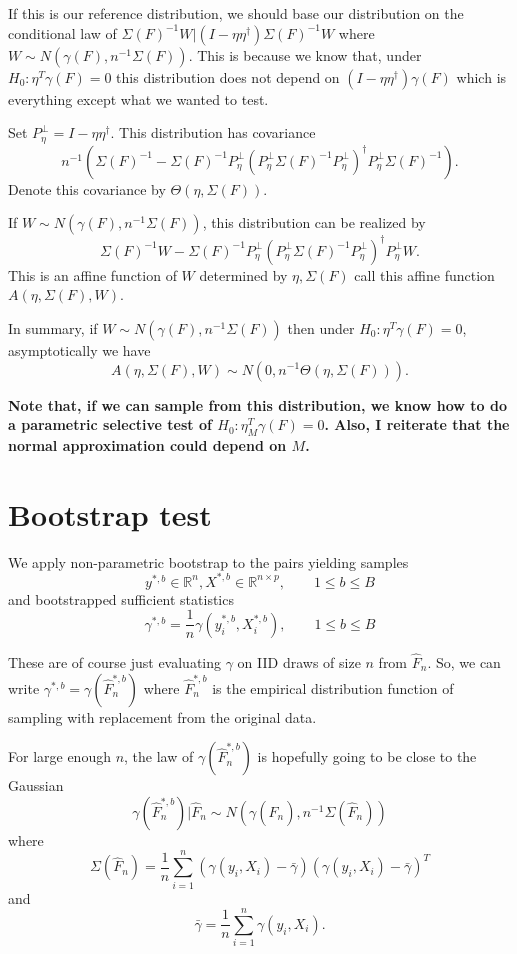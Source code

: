 \documentclass{article}
\newcommand{\real}{\mathbb{R}}
\begin{document}
If this is our reference distribution, we should base our distribution on the 
conditional law of $\Sigma(F)^{-1}W | (I - \eta\eta^{\dagger})\Sigma(F)^{-1}W$ where
$W \sim N(\gamma(F), n^{-1} \Sigma(F))$. This is because
we know that, under $H_0:\eta^T\gamma(F)=0$
this distribution does not depend on $(I-\eta\eta^{\dagger})\gamma(F)$ which
is everything except what we wanted to test. 

Set $P_{\eta}^{\perp}=I - \eta\eta^{\dagger}$.
This 
distribution has covariance
$$
n^{-1} \left(\Sigma(F)^{-1} - \Sigma(F)^{-1} P_{\eta}^{\perp} \left(P_{\eta}^{\perp} \Sigma(F)^{-1} P_{\eta}^{\perp} \right)^{\dagger}  P_{\eta}^{\perp} \Sigma(F)^{-1}  \right).
$$
Denote this covariance by $\Theta(\eta, \Sigma(F))$. 

If $W \sim N(\gamma(F), n^{-1}\Sigma(F))$,
this distribution can be realized by 
$$
\Sigma(F)^{-1} W - \Sigma(F)^{-1} P_{\eta}^{\perp} \left(P_{\eta}^{\perp} 
\Sigma(F)^{-1} P_{\eta}^{\perp} \right)^{\dagger}  P_{\eta}^{\perp} W.
$$
This is an affine function of $W$ determined by $\eta, \Sigma(F)$ 
call this affine function $A(\eta, \Sigma(F), W)$. 

In summary, if $W \sim N(\gamma(F), n^{-1}\Sigma(F))$ 
then under $H_0: \eta^T\gamma(F)=0$, asymptotically we have
$$
A(\eta, \Sigma(F), W) \sim N(0, n^{-1} \Theta(\eta, \Sigma(F))).
$$


{\bf Note that, if we can
sample from this distribution, we know how to
do a parametric selective test of $H_0:\eta_M^T\gamma(F)=0$.
Also, I reiterate that the normal approximation could depend on $M$.
}


\section{Bootstrap test}

We apply non-parametric bootstrap to the pairs 
yielding samples
$$
y^{*,b} \in \real^n,  X^{*,b} \in \real^{n \times p}, \qquad 1 \leq  b \leq B
$$
and  bootstrapped sufficient statistics
$$
\gamma^{*,b} = \frac{1}{n} \gamma(y_i^{*,b}, X_i^{*,b}),  \qquad 1 \leq  b \leq B
$$

These are of course just evaluating $\gamma$ on 
IID draws of size $n$ from $\hat{F}_n$. So,
we can write
$\gamma^{*,b} = \gamma(\hat{F}_n^{*,b})$
where $\hat{F}_n^{*,b}$ is the empirical
distribution function of sampling with replacement from the original data.

For large enough $n$, the law of $\gamma(\hat{F}_n^{*,b})$ is hopefully going to be close
to the Gaussian 
$$
\gamma(\hat{F}_n^{*,b}) | \hat{F}_n \sim N(\gamma(\hat{F}_n), n^{-1} \Sigma(\hat{F}_n))
$$
where
$$
\Sigma(\hat{F}_n) = \frac{1}{n} \sum_{i=1}^n \left(\gamma(y_i,X_i) - \bar{\gamma} \right)\left(\gamma(y_i,X_i) - \bar{\gamma} \right)^T
$$
and
$$
\bar{\gamma} = \frac{1}{n} \sum_{i=1}^n \gamma(y_i, X_i).
$$
\end{document}
